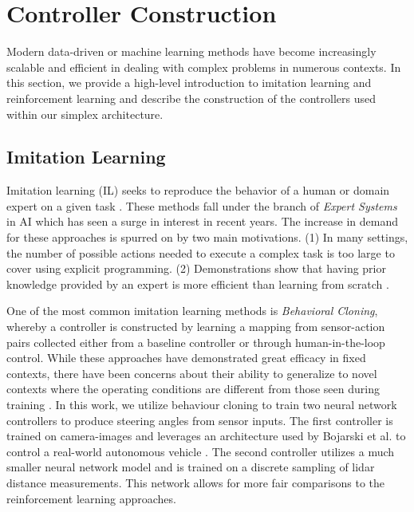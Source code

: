 \documentclass[manuscript,screen,review]{acmart}
\newcommand{\todo}[1]{\textcolor{red}{\textbf{\underline{TODO:}} #1}}
\begin{document}
\section{Controller Construction}

Modern data-driven or machine learning methods have become increasingly scalable and efficient in dealing with complex problems in numerous contexts. In this section, we provide a high-level introduction to imitation learning and reinforcement learning and describe the construction of the controllers used within our simplex architecture.

\subsection{Imitation Learning}

Imitation learning (IL) seeks to reproduce the behavior of a human or domain expert on a given task \cite{Hussein2017ImitationL}. These methods fall under the branch of \textit{Expert Systems} in AI which has seen a surge in interest in recent years. The increase in demand for these approaches is spurred on by two main motivations. (1) In many settings, the number of possible actions needed to execute a complex task is too large to cover using explicit programming. (2) Demonstrations show that having prior knowledge provided by an expert is more efficient than learning from scratch \cite{Hussein2017ImitationL}.

One of the most common imitation learning methods is \textit{Behavioral Cloning}, whereby a controller is constructed by learning a mapping from sensor-action pairs collected either from a baseline controller or through human-in-the-loop control. While these approaches have demonstrated great efficacy in fixed contexts, there have been concerns about their ability to generalize to novel contexts where the operating conditions are different from those seen during training \cite{Majumdar2017}.
In this work, we utilize behaviour cloning to train two neural network controllers to produce steering angles from sensor inputs. The first controller is trained on camera-images and leverages an architecture used by Bojarski et al. to control a real-world autonomous vehicle \cite{bojarski2016end}. The second controller utilizes a much smaller neural network model and is trained on a discrete sampling of lidar distance measurements. This network allows for more fair comparisons to the reinforcement learning approaches. %
\end{document}

